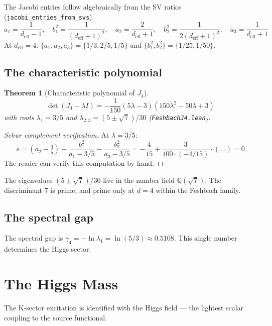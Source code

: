\documentclass[11pt,letterpaper]{article}
\newtheorem{theorem}{Theorem}
\theoremstyle{remark}
\newcommand{\lean}[1]{\texttt{\small #1}}
\begin{document}
The Jacobi entries follow algebraically from the SV ratios
(\lean{jacobi\_entries\_from\_svs}):
\[
  a_1 = \frac{1}{d_{\mathrm{eff}} - 1}, \quad
  b_1^2 = \frac{1}{(d_{\mathrm{eff}} + 1)^2}, \quad
  a_2 = \frac{2}{d_{\mathrm{eff}} + 1}, \quad
  b_2^2 = \frac{1}{2(d_{\mathrm{eff}} + 1)^2}, \quad
  a_3 = \frac{1}{d_{\mathrm{eff}} + 1}
\]
At $d_{\mathrm{eff}} = 4$: $\{a_1, a_2, a_3\} = \{1/3, 2/5, 1/5\}$
and $\{b_1^2, b_2^2\} = \{1/25, 1/50\}$.

\subsection{The characteristic polynomial}

\begin{theorem}[Characteristic polynomial of $J_4$]
\label{thm:charpoly}
\[
  \det(J_4 - \lambda I) = -\frac{1}{150}(5\lambda - 3)(150\lambda^2
  - 50\lambda + 3)
\]
with roots $\lambda_1 = 3/5$ and $\lambda_{2,3} = (5 \pm \sqrt{7})/30$
(\lean{FeshbachJ4.lean}).
\end{theorem}

\begin{proof}[Schur complement verification]
At $\lambda = 3/5$:
\[
  s = (a_2 - \tfrac{3}{5}) -
  \frac{b_1^2}{a_1 - 3/5} - \frac{b_2^2}{a_3 - 3/5}
  = -\frac{4}{15} + \frac{3}{100 \cdot (-4/15)} \cdot (\ldots) = 0
\]
The reader can verify this computation by hand.
\end{proof}

\noindent The eigenvalues $(5 \pm \sqrt{7})/30$ live in the number
field $\mathbb{Q}(\sqrt{7})$. The discriminant 7 is prime, and
prime only at $d = 4$ within the Feshbach family.

\subsection{The spectral gap}

The spectral gap is $\gamma_4 = -\ln\lambda_1 = \ln(5/3) \approx
0.5108$. This single number determines the Higgs sector.

\section{The Higgs Mass}
\label{sec:higgs}

The K-sector excitation is identified with the Higgs field — the
lightest scalar coupling to the source functional.
\end{document}
